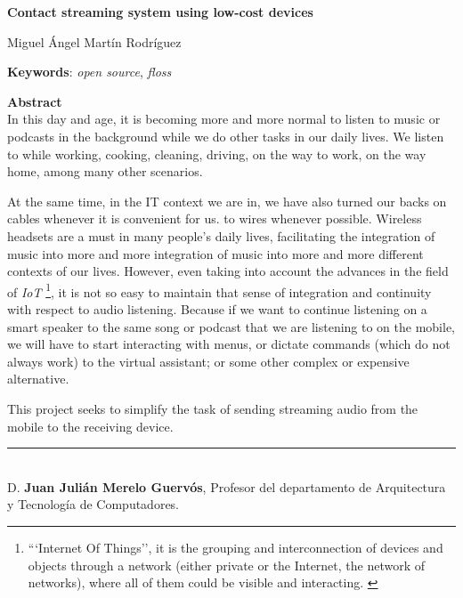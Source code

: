 \cleardoublepage
\begin{center}
	{\large\bfseries Contact streaming system using low-cost devices}\\
\end{center}
\begin{center}
	Miguel Ángel Martín Rodríguez\\
\end{center}
\vspace{0.5cm}
\noindent\textbf{Keywords}: \textit{open source}, \textit{floss}
\vspace{0.7cm}

\noindent\textbf{Abstract}\\
In this day and age, it is becoming more and more normal to listen to music or
podcasts in the background while we do other tasks in our daily lives. We listen
to while working, cooking, cleaning, driving, on the way to work, on the way
home, among many other scenarios. 

At the same time, in the IT context we are in, we have also turned our backs on
cables whenever it is convenient for us. to wires whenever possible. Wireless
headsets are a must in many people's daily lives, facilitating the integration
of music into more and more integration of music into more and more different
contexts of our lives. However, even taking into account the advances in the
field of \emph{IoT} \footnote{```Internet Of Things'', it is the grouping and
interconnection of devices and objects through a network (either private or the
Internet, the network of networks), where all of them could be visible and
interacting. \cite{IoT}}, it is not so easy to maintain that sense of
integration and continuity with respect to audio listening. Because if we want
to continue listening on a smart speaker to the same song or podcast that we are
listening to on the mobile, we will have to start interacting with menus, or
dictate commands (which do not always work) to the virtual assistant; or some
other complex or expensive alternative.

This project seeks to simplify the task of sending streaming audio from the
mobile to the receiving device.
\cleardoublepage

\thispagestyle{empty}

\noindent\rule[-1ex]{\textwidth}{2pt}\\[4.5ex]

D. \textbf{Juan Julián Merelo Guervós}, Profesor del departamento de Arquitectura y Tecnología de Computadores.

